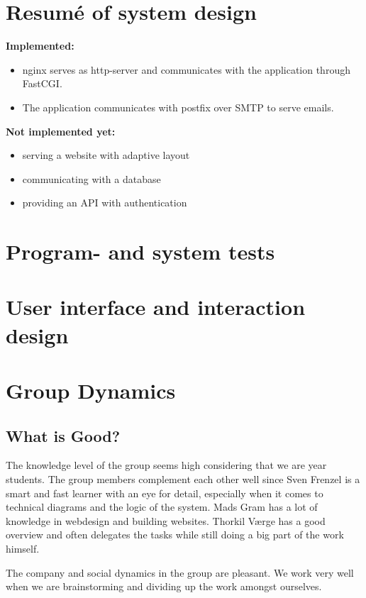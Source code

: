 \documentclass[11pt,a4paper]{report}
\begin{document}
\section{Resumé of system design}\label{sec:Systemdesign}
\textbf{Implemented:}
\begin{itemize}
\item nginx serves as http-server and communicates with the application 
through FastCGI.
\item The application communicates with postfix over SMTP to serve emails.
\end{itemize}
\textbf{Not implemented yet:}
\begin{itemize}
    \item serving a website with adaptive layout
    \item communicating with a database
    \item providing an API with authentication
\end{itemize}


\section{Program- and system tests}\label{sec:Program_systemtests}

\section{User interface and interaction design}\label{sec:UI_interactiondesign}

\section{Group Dynamics}
\subsection{What is Good?}
The knowledge level of the group seems high considering that we are  year students. The group members complement each other well since Sven Frenzel is a smart and fast learner with an eye for detail, especially when it comes to technical diagrams and the logic of the system. Mads Gram has a lot of knowledge in webdesign and building websites. Thorkil Værge has a good overview and often delegates the tasks while still doing a big part of the work himself.

The company and social dynamics in the group are pleasant. We work very well when we are brainstorming and dividing up the work amongst ourselves.
\end{document}
